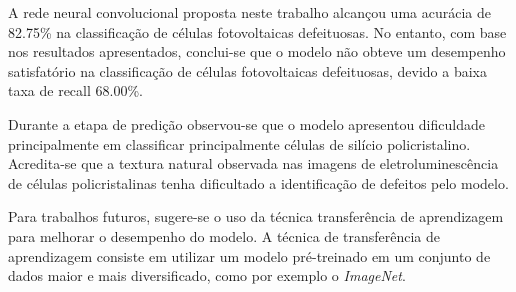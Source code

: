 \documentclass[conference]{IEEEtran}
\begin{document}
A rede neural convolucional proposta neste trabalho alcançou uma acurácia de
82.75\% na classificação de células fotovoltaicas defeituosas. No entanto,
com base nos resultados apresentados, conclui-se que o modelo não obteve um
desempenho satisfatório na classificação de células fotovoltaicas
defeituosas, devido a baixa taxa de recall 68.00\%.

Durante a etapa de predição observou-se que o modelo apresentou dificuldade
principalmente em classificar principalmente células de silício policristalino.
Acredita-se que a textura natural observada nas imagens de
eletroluminescência de células policristalinas tenha dificultado a
identificação de defeitos pelo modelo.

Para trabalhos futuros, sugere-se o uso da técnica transferência de
aprendizagem para melhorar o desempenho do modelo. A técnica de transferência
de aprendizagem consiste em utilizar um modelo pré-treinado em um conjunto de
dados maior e mais diversificado, como por exemplo o \textit{ImageNet}.



\end{document}
